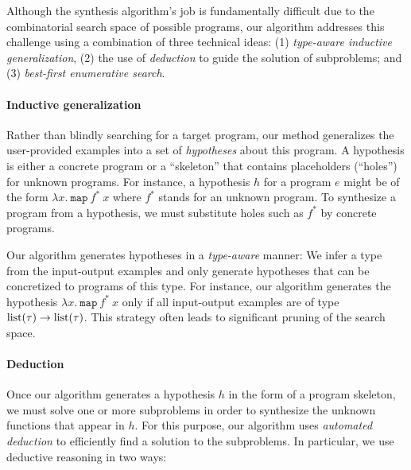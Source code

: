 Although the synthesis algorithm's job is fundamentally difficult due
to the combinatorial search space of possible programs, our algorithm
addresses this challenge using a combination of three technical ideas:
(1) {\em type-aware inductive generalization}, (2) the use of {\em
  deduction} to guide the solution of subproblems; and (3) {\em
  best-first enumerative search}.

\paragraph{Inductive generalization} Rather than blindly searching for a
target program, our method generalizes the user-provided examples
into a set of {\em hypotheses} about this program. A hypothesis is
either a concrete program or a ``skeleton'' that contains
placeholders (``holes'') for unknown programs. For instance, a
hypothesis $h$ for a program $e$ might be of the form
$\lambda x.\  \texttt{map}\  f^*\  x$
where $f^*$ stands for an unknown program. To synthesize a program from a
hypothesis, we must substitute holes such as $f^*$ by concrete programs.

Our algorithm generates hypotheses in a \emph{type-aware} manner: We infer a type  from the
input-output examples and only generate hypotheses that can be
concretized to programs of this type.  For instance, our algorithm
 generates the hypothesis $\lambda x.\  \texttt{map}\  f^*\  x$ %
only if all input-output
examples are of type ${\rm list}(\tau) \rightarrow {\rm
  list}(\tau)$. This strategy often leads to significant
pruning of the search space.


\paragraph{Deduction} 

Once our algorithm generates a hypothesis $h$ in the form of a program
skeleton, we must solve one or more subproblems in order to synthesize
the unknown functions that appear in $h$.  For this purpose, our
algorithm uses \emph{automated deduction} to efficiently find a
solution to the subproblems. In particular, we use deductive reasoning
in two ways:

